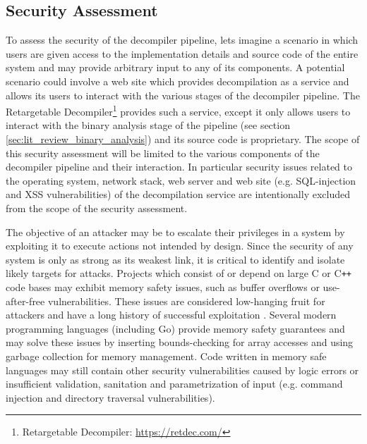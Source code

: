 
\subsection{Security Assessment}
\label{sec:ver_security_assessment}

To assess the security of the decompiler pipeline, lets imagine a scenario in which users are given access to the implementation details and source code of the entire system and may provide arbitrary input to any of its components. A potential scenario could involve a web site which provides decompilation as a service and allows its users to interact with the various stages of the decompiler pipeline. The Retargetable Decompiler\footnote{Retargetable Decompiler: \url{https://retdec.com/}} provides such a service, except it only allows users to interact with the binary analysis stage of the pipeline (see section \ref{sec:lit_review_binary_analysis}) and its source code is proprietary. The scope of this security assessment will be limited to the various components of the decompiler pipeline and their interaction. In particular security issues related to the operating system, network stack, web server and web site (e.g. SQL-injection and XSS vulnerabilities) of the decompilation service are intentionally excluded from the scope of the security assessment.

The objective of an attacker may be to escalate their privileges in a system by exploiting it to execute actions not intended by design. Since the security of any system is only as strong as its weakest link, it is critical to identify and isolate likely targets for attacks. Projects which consist of or depend on large C or C\texttt{++} code bases may exhibit memory safety issues, such as buffer overflows or use-after-free vulnerabilities. These issues are considered low-hanging fruit for attackers and have a long history of successful exploitation \cite{for_fun_and_profit}. Several modern programming languages (including Go) provide memory safety guarantees and may solve these issues by inserting bounds-checking for array accesses and using garbage collection for memory management. Code written in memory safe languages may still contain other security vulnerabilities caused by logic errors or insufficient validation, sanitation and parametrization of input (e.g. command injection and directory traversal vulnerabilities).

